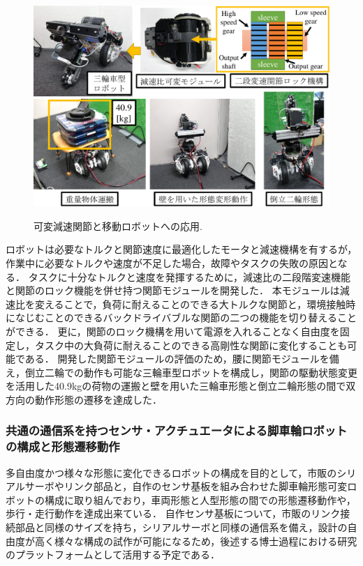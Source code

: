 \documentclass[twocolumn]{d-abst}
\begin{document}
\begin{figure}[tbh]
 \begin{center}
  \begin{minipage}{0.8\columnwidth}
   \includegraphics[width=\columnwidth]{3_module.pdf}
   \caption{可変減速関節と移動ロボットへの応用.}
  \end{minipage}
  \label{figure:nowprinting}
 \end{center}
\end{figure}

ロボットは必要なトルクと関節速度に最適化したモータと減速機構を有するが，作業中に必要なトルクや速度が不足した場合，故障やタスクの失敗の原因となる．
タスクに十分なトルクと速度を発揮するために，減速比の二段階変速機能と関節のロック機能を併せ持つ関節モジュールを開発した．
本モジュールは減速比を変えることで，負荷に耐えることのできる大トルクな関節と，環境接触時になじむことのできるバックドライバブルな関節の二つの機能を切り替えることができる．
更に，関節のロック機構を用いて電源を入れることなく自由度を固定し，タスク中の大負荷に耐えることのできる高剛性な関節に変化することも可能である．
開発した関節モジュールの評価のため，腰に関節モジュールを備え，倒立二輪での動作も可能な三輪車型ロボットを構成し，関節の駆動状態変更を活用した40.9kgの荷物の運搬と壁を用いた三輪車形態と倒立二輪形態の間で双方向の動作形態の遷移を達成した．

\subsubsection{共通の通信系を持つセンサ・アクチュエータによる脚車輪ロボットの構成と形態遷移動作}
多自由度かつ様々な形態に変化できるロボットの構成を目的として，市販のシリアルサーボやリンク部品と，自作のセンサ基板を組み合わせた脚車輪形態可変ロボットの構成に取り組んでおり，車両形態と人型形態の間での形態遷移動作や，歩行・走行動作を達成出来ている．
自作センサ基板について，市販のリンク接続部品と同様のサイズを持ち，シリアルサーボと同様の通信系を備え，設計の自由度が高く様々な構成の試作が可能になるため，後述する博士過程における研究のプラットフォームとして活用する予定である．
\end{document}
